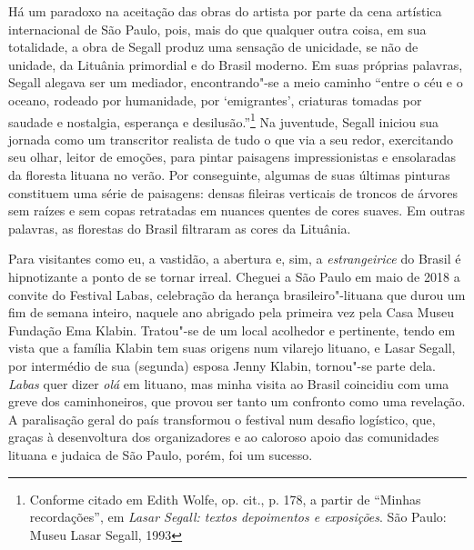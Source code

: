 Há um paradoxo na aceitação das obras do artista por parte da
cena artística internacional de São Paulo, pois, mais do que qualquer
outra coisa, em sua totalidade, a obra de Segall produz uma sensação de
unicidade, se não de unidade, da Lituânia primordial e do Brasil
moderno. Em suas próprias palavras, Segall alegava ser um mediador,
encontrando"-se a meio caminho ``entre o céu e o oceano, rodeado por
humanidade, por `emigrantes', criaturas tomadas por saudade e nostalgia,
esperança e desilusão.''\footnote{Conforme citado em Edith Wolfe, op. cit., p. 178, a partir de
  ``Minhas recordações'', em \textit{Lasar Segall: textos depoimentos e
  exposições}. São Paulo: Museu Lasar Segall, 1993} Na juventude,
Segall iniciou sua jornada como um transcritor realista de tudo o que
via a seu redor, exercitando seu olhar, leitor de emoções, para pintar
paisagens impressionistas e ensolaradas da floresta lituana no verão.
Por conseguinte, algumas de suas últimas pinturas constituem uma série
de paisagens: densas fileiras verticais de troncos de árvores sem raízes
e sem copas retratadas em nuances quentes de cores suaves. Em outras
palavras, as florestas do Brasil filtraram as cores da Lituânia.

Para visitantes como eu, a vastidão, a abertura e, sim, a
\textit{estrangeirice} do Brasil é hipnotizante a ponto de se tornar irreal.
Cheguei a São Paulo em maio de 2018 a convite do Festival Labas,
celebração da herança brasileiro"-lituana que durou um fim de semana
inteiro, naquele ano abrigado pela primeira vez pela Casa Museu Fundação 
Ema Klabin. Tratou"-se de um local acolhedor e pertinente, tendo
em vista que a família Klabin tem suas origens num vilarejo lituano, e
Lasar Segall, por intermédio de sua (segunda) esposa Jenny Klabin,
tornou"-se parte dela. \textit{Labas} quer dizer \textit{olá} em lituano, mas
minha visita ao Brasil coincidiu com uma greve dos caminhoneiros, que
provou ser tanto um confronto como uma revelação. A paralisação geral do
país transformou o festival num desafio logístico, que, graças à
desenvoltura dos organizadores e ao caloroso apoio das comunidades
lituana e judaica de São Paulo, porém, foi um sucesso. 

